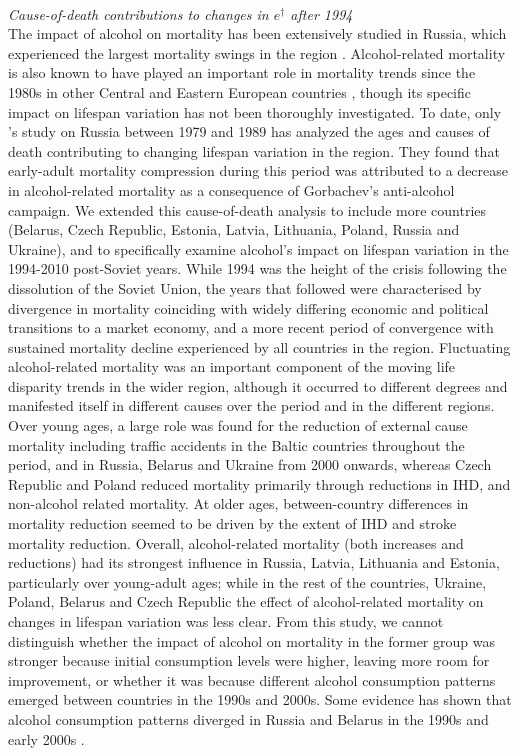 \documentclass{article}
\begin{document}
\begin{spacing}{1.5}
\\

\emph{Cause-of-death contributions to changes in $e^\dagger$ after 1994}\\

The impact of alcohol on mortality has been extensively studied in Russia, which experienced the largest mortality swings in the region \citep{leon1997huge,rehm2007, shkolnikov2013components,shkolnikov2001}. Alcohol-related mortality is also known to have played an important role in mortality trends since the 1980s in other Central and Eastern European countries \citep{ rehm2007}, though its specific impact on lifespan variation has not been thoroughly investigated. To date, only \citet{shkolnikov2003}'s study on Russia between 1979 and 1989 has analyzed the ages and causes of death contributing to changing lifespan variation in the region. They found that early-adult mortality compression during this period was attributed to a decrease in alcohol-related mortality as a consequence of Gorbachev's anti-alcohol campaign. We extended this cause-of-death analysis to include more countries (Belarus, Czech Republic, Estonia, Latvia, Lithuania, Poland, Russia and Ukraine), and to specifically examine alcohol's impact on lifespan variation in the 1994-2010 post-Soviet years. While 1994 was the height of the crisis following the dissolution of the Soviet Union, the years that followed were characterised by divergence in mortality coinciding with widely differing economic and political transitions to a market economy, and a more recent period of convergence with sustained mortality decline experienced by all countries in the region.
Fluctuating alcohol-related mortality was an important component of the moving life disparity trends in the wider region, although it occurred to different degrees and manifested itself in different causes over the period and in the different regions.  Over young ages, a large role was found for the reduction of external cause mortality including traffic accidents in the Baltic countries throughout the period, and in Russia, Belarus and Ukraine from 2000 onwards, whereas Czech Republic and Poland reduced mortality primarily through reductions in IHD, and non-alcohol related mortality. At older ages, between-country differences in mortality reduction seemed to be driven by the extent of IHD and stroke mortality reduction. Overall, alcohol-related mortality (both increases and reductions) had its strongest influence in Russia, Latvia, Lithuania and Estonia, particularly over young-adult ages; while in the rest of the countries, Ukraine, Poland, Belarus and Czech Republic the effect of alcohol-related mortality on changes in lifespan variation was less clear. From this study, we cannot distinguish whether the impact of alcohol on mortality in the former group was stronger because initial consumption levels were higher, leaving more room for improvement, or whether it was because different alcohol consumption patterns emerged between countries in the 1990s and 2000s. Some evidence has shown that alcohol consumption patterns diverged in Russia and Belarus in the 1990s and early 2000s \citep{grigoriev2015}. 

\end{spacing}
\end{document}
